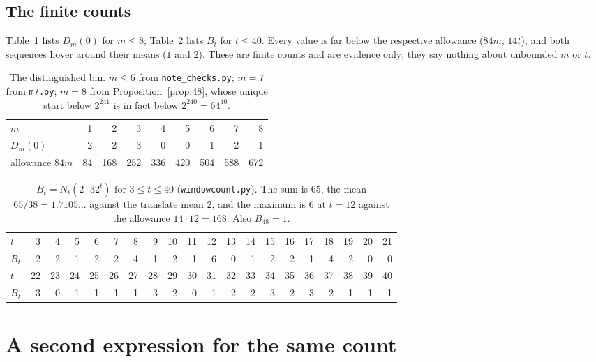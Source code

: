 \documentclass[11pt,a4paper]{article}
\theoremstyle{plain}
\theoremstyle{definition}
\theoremstyle{remark}
\begin{document}
\subsection{The finite counts}

Table~\ref{tab:bins} lists $D_m(0)$ for $m\le 8$; Table~\ref{tab:Bt} lists
$B_t$ for $t\le 40$. Every value is far below the respective allowance
($84m$, $14t$), and both sequences hover around their means ($1$ and $2$).
These are finite counts and are evidence only; they say nothing about
unbounded $m$ or $t$.

\begin{table}[ht]
\centering
\begin{tabular}{lrrrrrrrr}
\toprule
$m$ & 1 & 2 & 3 & 4 & 5 & 6 & 7 & 8\\
$D_m(0)$ & 2 & 2 & 3 & 0 & 0 & 1 & 2 & 1\\
allowance $84m$ & 84 & 168 & 252 & 336 & 420 & 504 & 588 & 672\\
\bottomrule
\end{tabular}
\caption{The distinguished bin. $m\le 6$ from \texttt{note\_checks.py};
$m=7$ from \texttt{m7.py}; $m=8$ from Proposition~\ref{prop:48}, whose unique
start below $2^{241}$ is in fact below $2^{240}=64^{40}$.}
\label{tab:bins}
\end{table}

\begin{table}[ht]
\centering\footnotesize
\setlength{\tabcolsep}{3.1pt}
\begin{tabular}{l*{19}{r}}
\toprule
$t$   & 3&4&5&6&7&8&9&10&11&12&13&14&15&16&17&18&19&20&21\\
$B_t$ & 2&2&1&2&2&4&1&2&1&6&0&1&2&2&1&4&2&0&0\\
\midrule
$t$   & 22&23&24&25&26&27&28&29&30&31&32&33&34&35&36&37&38&39&40\\
$B_t$ & 3&0&1&1&1&1&3&2&0&1&2&2&3&2&3&2&1&1&1\\
\bottomrule
\end{tabular}
\caption{$B_t=N_t(2\cdot 32^t)$ for $3\le t\le 40$ (\texttt{windowcount.py}).
The sum is $65$, the mean $65/38=1.7105\ldots$ against the translate mean $2$,
and the maximum is $6$ at $t=12$ against the allowance $14\cdot 12=168$. Also
$B_{48}=1$.}
\label{tab:Bt}
\end{table}

\section{A second expression for the same count}\label{sec:split}
\end{document}
